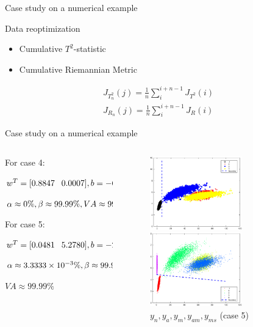 \documentclass[10pt]{beamer}
\begin{document}
\begin{frame}{Case study on a numerical example}
      \begin{exampleblock}{Data reoptimization}
	\begin{itemize}
    \item Cumulative  $T^2$-statistic
    \item Cumulative  Riemannian Metric
    \end{itemize}
    \end{exampleblock}
    \begin{small}
    \begin{equation}\nonumber
       \begin{aligned}
       J_{T_n^2}(j) = \frac{1}{n}\sum_{i}^{i+n-1}J_{T^2}(i) \\
       J_{R_n}(j) = \frac{1}{n}\sum_{i}^{i+n-1}J_R(i)
       \end{aligned}
    \end{equation}
    \end{small}
\end{frame}
\begin{frame}{Case study on a numerical example}
     \begin{columns}
             \begin{column}{0.5\textwidth}
       For case 4: \par
     $\scriptsize{w^T = [ 0.8847 \quad 0.0007]
 , b =-6.3180 } $\par $\scriptsize{\alpha  \approx 0\%,\beta  \approx 99.99 \% ,VA \approx 99.99} \% $ \par 
 For case 5: \par 
   $\scriptsize{w^T = [0.0481 \quad 5.2780]
 , b = -23.5837} $\par $\scriptsize{\alpha  \approx 3.3333\times 10^{-3} \%,\beta  \approx 99.97\% }$ \par 
$VA \approx 99.99 \% $
           \end{column}
        \begin{column}{0.5\textwidth}  %
    \begin{figure}
        \centering
        \includegraphics[width=4cm]{fig/Cu3.eps}
        \caption{$y_n,y_a,y_m,y_{am}$ (case 4)}
        \includegraphics[width=4cm]{fig/miniVarP.eps}
        \caption{ $y_n,y_a,y_{m},y_{am},y_{ms}$ (case 5)}
        \end{figure}
  
        \end{column}
    \end{columns}
\end{frame}
\end{document}
